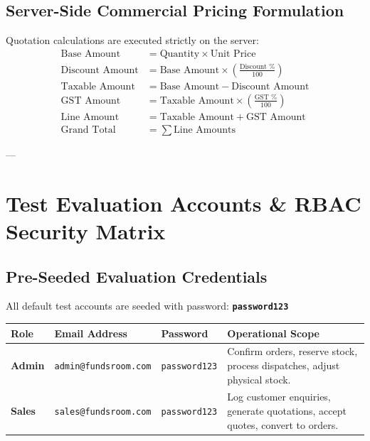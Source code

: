 \documentclass[11pt,a4paper]{article}
\begin{document}
\subsection{Server-Side Commercial Pricing Formulation}
Quotation calculations are executed strictly on the server:
\begin{align}
\text{Base Amount} &= \text{Quantity} \times \text{Unit Price} \\
\text{Discount Amount} &= \text{Base Amount} \times \left( \frac{\text{Discount \%}}{100} \right) \\
\text{Taxable Amount} &= \text{Base Amount} - \text{Discount Amount} \\
\text{GST Amount} &= \text{Taxable Amount} \times \left( \frac{\text{GST \%}}{100} \right) \\
\text{Line Amount} &= \text{Taxable Amount} + \text{GST Amount} \\
\text{Grand Total} &= \sum \text{Line Amounts}
\end{align}

---

\section{Test Evaluation Accounts \& RBAC Security Matrix}

\subsection{Pre-Seeded Evaluation Credentials}
All default test accounts are seeded with password: \textbf{\texttt{password123}}

\begin{table}[htbp]
\centering
\small
\begin{tabularx}{\textwidth}{l l l X}
\toprule
\textbf{Role} & \textbf{Email Address} & \textbf{Password} & \textbf{Operational Scope} \\
\midrule
\textbf{Admin} & \texttt{admin@fundsroom.com} & \texttt{password123} & Confirm orders, reserve stock, process dispatches, adjust physical stock. \\
\textbf{Sales} & \texttt{sales@fundsroom.com} & \texttt{password123} & Log customer enquiries, generate quotations, accept quotes, convert to orders. \\
\bottomrule
\end{tabularx}
\end{table}
\end{document}
